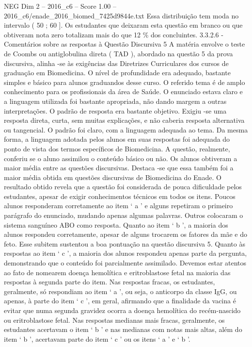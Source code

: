 \begin{textsample}{NEG Dim 2 – 2016\_c6 – Score 1.00 – 2016\_c6/enade\_2016\_biomed\_7425d9844e.txt}
Essa distribuição tem moda no intervalo ( 50 ; 60 ].
Os estudantes que deixaram esta questão em branco ou que obtiveram nota zero totalizam mais do que 12 \% dos concluintes. 3.3.2.6 - Comentários sobre as respostas à Questão Discursiva 5 A matéria envolve o teste de Coombs ou antiglobulina direta ( TAD ), abordado na questão 5 da prova discursiva, alinha -se às exigências das Diretrizes Curriculares dos cursos de graduação em Biomedicina.
O nível de profundidade era adequado, bastante simples e básico para alunos graduandos desse curso.
O referido tema é de amplo conhecimento para os profissionais da área de Saúde.
O enunciado estava claro e a linguagem utilizada foi bastante apropriada, não dando margem a outras interpretações.
O padrão de resposta era bastante objetivo.
Exigiu -se uma resposta direta, curta, sem muitas explicações, e não caberia resposta alternativa ou tangencial.
O padrão foi claro, com a linguagem adequada ao tema.
Da mesma forma, a linguagem adotada pelos alunos em suas respostas foi adequada do ponto de vista dos termos específicos de Biomedicina.
A questão, realmente, conferiu se o aluno assimilou o conteúdo básico ou não.
Os alunos obtiveram a maior média entre as questões discursivas.
Destaca -se que essa também foi a maior média obtida em questões discursivas de Biomedicina do Enade.
O resultado obtido revela que a questão foi considerada de pouca dificuldade pelos estudantes, apesar de exigir conhecimentos técnicos em todos os itens.
Poucos alunos responderam corretamente ao item ‘ a ’ e alguns repetiram o primeiro parágrafo do enunciado, mudando apenas algumas palavras.
Outros colocaram o sistema sanguíneo ABO como resposta.
Quanto ao item ‘ b ’, a maioria dos alunos respondeu corretamente, apesar de alguns trocarem os fatores da mãe e do feto.
Esse subitem sustentou a boa pontuação na questão discursiva 5.
Quanto às respostas ao item ‘ c ’, a maioria dos alunos respondeu apenas parte da pergunta, demonstrando que o conteúdo foi parcialmente assimilado.
Devemos estar atentos ao fato de nomearem doença hemolítica e eritroblastose fetal na maioria das respostas à segunda parte do item.
Nas respostas fracas, os estudantes, geralmente, só respondiam ao item ‘ a ’, ou seja, o anticorpo da classe IgG, ou apenas, à parte do item ‘ c ’, em geral, afirmando que a finalidade da vacina é evitar que numa segunda gravidez ocorra a doença hemolítica do recém-nascido ou eritroblastose fetal.
Nas respostas medianas mais fracas, geralmente, os estudantes acertavam o item ‘ b ’ e nas medianas com notas mais altas, além do item ‘ b ’, acertavam parte do item ‘ c ’ ou os itens ‘ a ’ e ‘ b ’.

\end{textsample}
